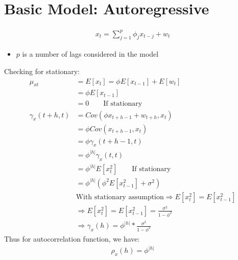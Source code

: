 \section{Basic Model: Autoregressive}
\begin{align*}
    x_t = \sum_{j=1}^p \phi_j x_{t-j} + w_t
\end{align*}
\begin{itemize}
    \item $p$ is a number of lags considered in the model 
\end{itemize}
Checking for stationary: \\
    \begin{align*}
        \mu_{xt} & = E[x_t] = \phi E[x_{t-1}] + E[w_t] \\
                    & = \phi E[x_{t-1}]\\
                    & = 0 \qquad \textrm{If stationary} \\
        \gamma_x(t+h, t) &= Cov(\phi x_{t+h-1} + w_{t+h}, x_t) \\
            &= \phi Cov(x_{t+h-1}, x_t) \\
            &= \phi \gamma_x(t+h-1, t) \\
            &= \phi^{|h|}\gamma_x(t,t) \\
            & = \phi^{|h|} E[x_t^2] \qquad \textrm{If stationary} \\
            & = \phi^{|h|} (\phi^2 E[x^2_{t-1}] + \sigma^2) \\
            & \textrm{With stationary assumption} \Longrightarrow E[x_t^2] = E[x^2_{t-1}] \\
            & \Longrightarrow  E[x_t^2] = E[x^2_{t-1}] = \frac{\sigma^2}{1-\phi^2}\\
            & \Longrightarrow \gamma_x(h) = \phi^{|h|} * \frac{\sigma^2}{1-\phi^2}
    \end{align*}
Thus for autocorrelation function, we have: 
    \begin{align*}
        \rho_x(h) = \phi^{|h|}
    \end{align*}

